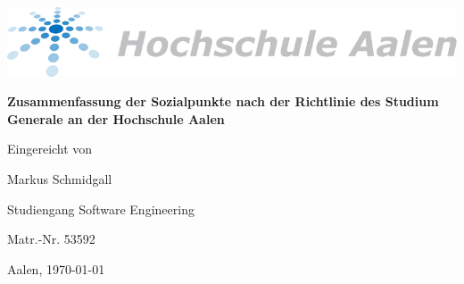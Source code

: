 \documentclass[a4paper, 12pt]{scrartcl} %
\author{Markus Schmidgall}
\date{\today}
\begin{document}
\begin{titlepage}
	\centering
	\includegraphics[width=1\textwidth]{Logo.png}\par\vspace{3cm}
	{\huge\bfseries Zusammenfassung der Sozialpunkte nach der Richtlinie des Studium Generale an der Hochschule Aalen\par}
	\vspace{4cm}
	{\large Eingereicht von\par
	Markus Schmidgall \par
	Studiengang Software Engineering\par
	Matr.-Nr. 53592}
	\vfill

	Aalen, \today\par
\end{titlepage}

\tableofcontents
\clearpage
\end{document}
